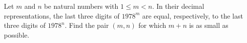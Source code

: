 Let $m$ and $n$ be natural numbers with $1\le m<n$. In their decimal representations, the last three digits of $1978^m$ are equal, respectively, to the last three digits of $1978^n$. Find the pair $(m,n)$ for which $m+n$ is as small as possible.

